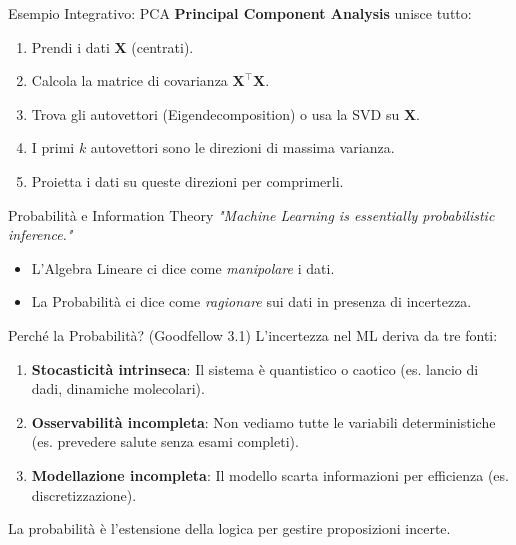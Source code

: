 \documentclass[aspectratio=169, 10pt]{beamer}
\begin{document}
\begin{frame}{Esempio Integrativo: PCA}
    \textbf{Principal Component Analysis} unisce tutto:
    \begin{enumerate}
        \item Prendi i dati $\mathbf{X}$ (centrati).
        \item Calcola la matrice di covarianza $\mathbf{X}^\top \mathbf{X}$.
        \item Trova gli autovettori (Eigendecomposition) o usa la SVD su $\mathbf{X}$.
        \item I primi $k$ autovettori sono le direzioni di massima varianza.
        \item Proietta i dati su queste direzioni per comprimerli.
    \end{enumerate}
\end{frame}

\begin{frame}{Probabilità e Information Theory}
    \centering
    \emph{"Machine Learning is essentially probabilistic inference."}
    
    \vspace{1em}
    \begin{itemize}
        \item L'Algebra Lineare ci dice come \emph{manipolare} i dati.
        \item La Probabilità ci dice come \emph{ragionare} sui dati in presenza di incertezza.
    \end{itemize}
\end{frame}

\begin{frame}{Perché la Probabilità? (Goodfellow 3.1)}
    L'incertezza nel ML deriva da tre fonti:
    \begin{enumerate}
        \item \textbf{Stocasticità intrinseca}: Il sistema è quantistico o caotico (es. lancio di dadi, dinamiche molecolari).
        \item \textbf{Osservabilità incompleta}: Non vediamo tutte le variabili deterministiche (es. prevedere salute senza esami completi).
        \item \textbf{Modellazione incompleta}: Il modello scarta informazioni per efficienza (es. discretizzazione).
    \end{enumerate}
    La probabilità è l'estensione della logica per gestire proposizioni incerte.
\end{frame}
\end{document}
